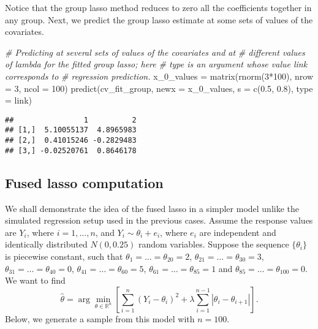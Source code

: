 \documentclass[
]{book}
\newenvironment{Shaded}{\begin{snugshade}}{\end{snugshade}}
\newcommand{\AttributeTok}[1]{\textcolor[rgb]{0.77,0.63,0.00}{#1}}
\newcommand{\CommentTok}[1]{\textcolor[rgb]{0.56,0.35,0.01}{\textit{#1}}}
\newcommand{\DecValTok}[1]{\textcolor[rgb]{0.00,0.00,0.81}{#1}}
\newcommand{\FloatTok}[1]{\textcolor[rgb]{0.00,0.00,0.81}{#1}}
\newcommand{\FunctionTok}[1]{\textcolor[rgb]{0.00,0.00,0.00}{#1}}
\newcommand{\NormalTok}[1]{#1}
\newcommand{\OtherTok}[1]{\textcolor[rgb]{0.56,0.35,0.01}{#1}}
\newcommand{\SpecialCharTok}[1]{\textcolor[rgb]{0.00,0.00,0.00}{#1}}
\newcommand{\StringTok}[1]{\textcolor[rgb]{0.31,0.60,0.02}{#1}}
\begin{document}
Notice that the group lasso method reduces to zero all the coefficients together in any group. Next, we predict the group lasso estimate at some sets of values of the covariates.

\begin{Shaded}
\begin{Highlighting}[]
\CommentTok{\# Predicting at several sets of values of the covariates and at}
\CommentTok{\# different values of lambda for the fitted group lasso; here}
\CommentTok{\# \textquotesingle{}type\textquotesingle{} is an argument whose value \textquotesingle{}link\textquotesingle{} corresponds to}
\CommentTok{\# regression prediction.}
\NormalTok{x\_0\_values }\OtherTok{=} \FunctionTok{matrix}\NormalTok{(}\FunctionTok{rnorm}\NormalTok{(}\DecValTok{3}\SpecialCharTok{*}\DecValTok{100}\NormalTok{), }\AttributeTok{nrow =} \DecValTok{3}\NormalTok{, }\AttributeTok{ncol =} \DecValTok{100}\NormalTok{)}
\FunctionTok{predict}\NormalTok{(cv\_fit\_group, }\AttributeTok{newx =}\NormalTok{ x\_0\_values, }\AttributeTok{s =} \FunctionTok{c}\NormalTok{(}\FloatTok{0.5}\NormalTok{, }\FloatTok{0.8}\NormalTok{),}
        \AttributeTok{type =} \StringTok{\textquotesingle{}link\textquotesingle{}}\NormalTok{)}
\end{Highlighting}
\end{Shaded}

\begin{verbatim}
##                1          2
## [1,]  5.10055137  4.8965983
## [2,]  0.41015246 -0.2829483
## [3,] -0.02520761  0.8646178
\end{verbatim}

\hypertarget{fusedlasso-computation}{%
\subsection{Fused lasso computation}\label{fusedlasso-computation}}

We shall demonstrate the idea of the fused lasso in a simpler model unlike the simulated regression setup used in the previous cases. Assume the response values are \(Y_i\), where \(i = 1, \ldots, n\), and \(Y_i \sim \theta_i + e_i\), where \(e_i\) are independent and identically distributed \(N(0, 0.25)\) random variables. Suppose the sequence \(\{\theta_i\}\) is piecewise constant, such that \(\theta_1 = \ldots = \theta_{20} = 2\), \(\theta_{21} = \ldots = \theta_{30} = 3\), \(\theta_{31} = \ldots = \theta_{40} = 0\), \(\theta_{41} = \ldots = \theta_{60} = 5\), \(\theta_{61} = \ldots = \theta_{85} = 1\) and \(\theta_{85} = \ldots = \theta_{100} = 0\). We want to find
\[\hat{\theta} = \arg\min_{\theta \in \mathbb{R}^n} \left[ \sum_{i=1}^n (Y_i - \theta_i)^2 + \lambda \sum_{i=1}^{n-1} | \theta_i - \theta_{i+1} | \right].\]
Below, we generate a sample from this model with \(n = 100\).
\end{document}

